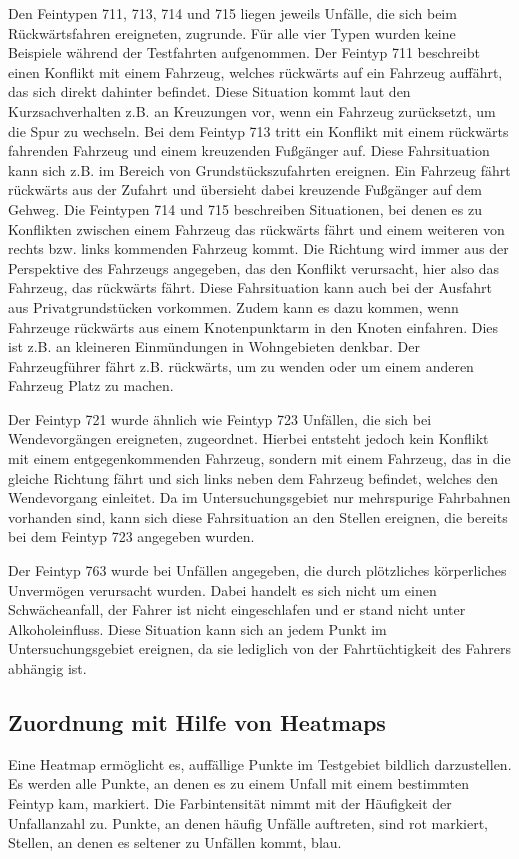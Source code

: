 Den Feintypen 711, 713, 714 und 715 liegen jeweils Unfälle, die sich beim Rückwärtsfahren ereigneten, zugrunde. Für alle vier Typen wurden keine Beispiele während der Testfahrten aufgenommen. Der Feintyp 711 beschreibt einen Konflikt mit einem Fahrzeug, welches rückwärts auf ein Fahrzeug auffährt, das sich direkt dahinter befindet. Diese Situation kommt laut den Kurzsachverhalten z.B. an Kreuzungen vor, wenn ein Fahrzeug zurücksetzt, um die Spur zu wechseln. Bei dem Feintyp 713 tritt ein Konflikt mit einem rückwärts fahrenden Fahrzeug und einem kreuzenden Fußgänger auf. Diese Fahrsituation kann sich z.B. im Bereich von Grundstückszufahrten ereignen. Ein Fahrzeug fährt rückwärts aus der Zufahrt und übersieht dabei kreuzende Fußgänger auf dem Gehweg. Die Feintypen 714 und 715 beschreiben Situationen, bei denen es zu Konflikten zwischen einem Fahrzeug das rückwärts fährt und einem weiteren von rechts bzw. links kommenden Fahrzeug kommt. Die Richtung wird immer aus der Perspektive des Fahrzeugs angegeben, das den Konflikt verursacht, hier also das Fahrzeug, das rückwärts fährt. Diese Fahrsituation kann auch bei der Ausfahrt aus Privatgrundstücken vorkommen. Zudem kann es dazu kommen, wenn Fahrzeuge rückwärts aus einem Knotenpunktarm in den Knoten einfahren. Dies ist z.B. an kleineren Einmündungen in Wohngebieten denkbar. Der Fahrzeugführer fährt z.B. rückwärts, um zu wenden oder um einem anderen Fahrzeug Platz zu machen.

Der Feintyp 721 wurde ähnlich wie Feintyp 723 Unfällen, die sich bei Wendevorgängen ereigneten, zugeordnet. Hierbei entsteht jedoch kein Konflikt mit einem entgegenkommenden Fahrzeug, sondern mit einem Fahrzeug, das in die gleiche Richtung fährt und sich links neben dem Fahrzeug befindet, welches den Wendevorgang einleitet. Da im Untersuchungsgebiet nur mehrspurige Fahrbahnen vorhanden sind, kann sich diese Fahrsituation an den Stellen ereignen, die bereits bei dem Feintyp 723 angegeben wurden.

Der Feintyp 763 wurde bei Unfällen angegeben, die durch plötzliches körperliches Unvermögen verursacht wurden. Dabei handelt es sich nicht um einen Schwächeanfall, der Fahrer ist nicht eingeschlafen und er stand nicht unter Alkoholeinfluss. Diese Situation kann sich an jedem Punkt im Untersuchungsgebiet ereignen, da sie lediglich von der Fahrtüchtigkeit des Fahrers abhängig ist.

\subsection{Zuordnung mit Hilfe von Heatmaps}\label{section:Heatmaps}
Eine Heatmap ermöglicht es, auffällige Punkte im Testgebiet bildlich darzustellen. Es werden alle Punkte, an denen es zu einem Unfall mit einem bestimmten Feintyp kam, markiert. Die Farbintensität nimmt mit der Häufigkeit der Unfallanzahl zu. Punkte, an denen häufig Unfälle auftreten, sind rot markiert, Stellen, an denen es seltener zu Unfällen kommt, blau.

